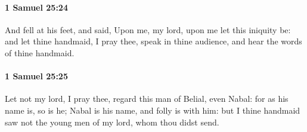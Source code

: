 		\paragraph{1 Samuel 25:24} %
			\label{1SAMUEL-25-24}

			And fell at his feet, and said, Upon me, my lord, upon me let this iniquity be: and let thine handmaid, I pray thee, speak in thine audience, and hear the words of thine handmaid.


		\paragraph{1 Samuel 25:25} %
			\label{1SAMUEL-25-25}

			Let not my lord, I pray thee, regard this man of Belial, even Nabal: for as his name is, so is he; Nabal is his name, and folly is with him: but I thine handmaid saw not the young men of my lord, whom thou didst send.

